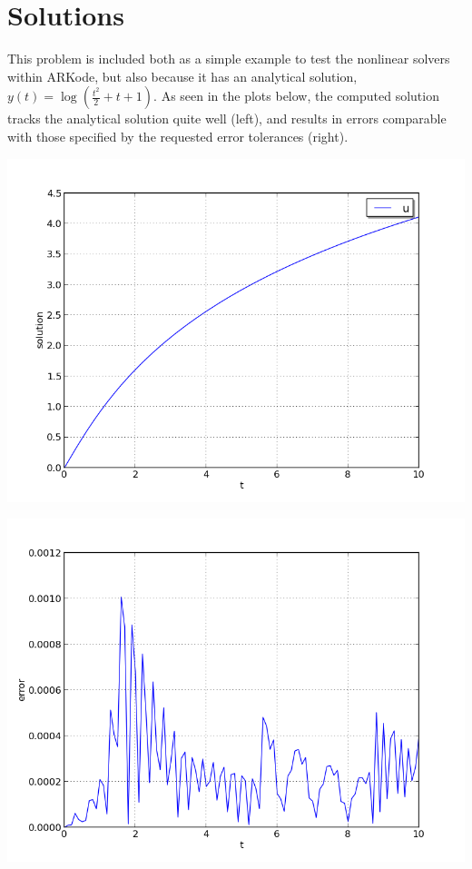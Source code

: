 \documentclass[letterpaper,10pt,english]{sphinxmanual}
\begin{document}
\section{Solutions}
\label{ark_analytic_nonlin:solutions}
This problem is included both as a simple example to test the
nonlinear solvers within ARKode, but also because it has an analytical
solution, $y(t) = \log\left(\frac{t^2}{2} + t + 1\right)$.  As
seen in the plots below, the computed solution tracks the analytical solution
quite well (left), and results in errors comparable with those
specified by the requested error tolerances (right).

\includegraphics[width=0.450\linewidth]{plot-ark_analytic_nonlin.png}

\includegraphics[width=0.450\linewidth]{plot-ark_analytic_nonlin_error.png}
\end{document}
